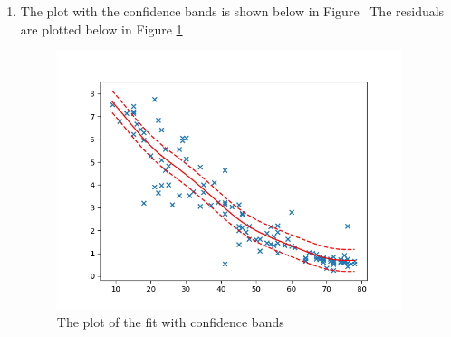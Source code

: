 \documentclass[10pt]{article}
\begin{document}
\begin{enumerate}[label=(\Alph*)]
		\item
		The plot with the confidence bands is shown below in Figure \
     	The residuals are plotted below in Figure \ref{fig:local_linear_estimate}
		\begin{figure}[htb] \centering
		\includegraphics[width=0.95\textwidth]{./local_estimate.png}
		\caption{The plot of the fit with confidence bands}
		\label{fig:local_linear_estimate}
		\end{figure}

	\end{enumerate}
\end{document}
